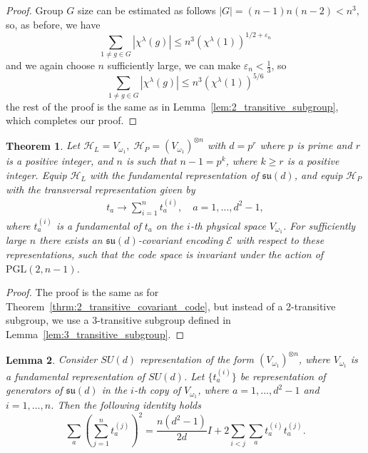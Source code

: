 \documentclass[10pt,twocolumn,superscriptaddress,aps,amsmath,amssymb,citeautoscript,floatfix,prx]{revtex4-2}
\theoremstyle{plain}
\theoremstyle{plain}
\theoremstyle{plain}
\theoremstyle{plain}
\theoremstyle{plain}
\theoremstyle{plain}
\theoremstyle{plain}
\newtheorem{smtheorem}{Theorem}[section]
\newtheorem{smlemma}[smtheorem]{Lemma}
\theoremstyle{definition}
\theoremstyle{plain}
\begin{document}
\begin{appendix}
\begin{proof}
    Group $G$ size can be estimated as follows
    $
        |G|=(n-1) n(n-2)<n^3,
    $
    so, as before, we have
    \[
        \sum_{1 \neq g \in G}\left|\chi^\lambda(g)\right| \leq n^3\left(\chi^\lambda(1)\right)^{1 / 2+\varepsilon_n}
    \]
    and we again choose $n$ sufficiently large, we can make $\varepsilon_n<\frac{1}{3}$, so
    \[
        \sum_{1 \neq g \in G}\left|\chi^\lambda(g)\right| \leq n^3\left(\chi^\lambda(1)\right)^{5 / 6}
    \]
    the rest of the proof is the same as in Lemma~\ref{lem:2_transitive_subgroup}, which completes our proof.
\end{proof}

\begin{smtheorem}\label{thrm:3_transitive_covariant_code}
        Let
    $
        \mathcal H_L=V_{\omega_1},\;
        \mathcal H_P=(V_{\omega_1})^{\otimes n}
    $
    with $d=p^r$ where $p$ is prime and $r$ is a positive integer, 
    and $n$ is such that $n-1=p^k$, where $k \geq r$ is a positive integer. 
    Equip \(\mathcal H_L\) with the fundamental representation of
    \(\mathfrak{su}(d)\), and equip \(\mathcal H_P\) with the transversal
    representation given by
    \begin{equation}
    \begin{gathered}
    t_a \rightarrow \sum_{i=1}^n t_a^{(i)}, \quad a=1,\ldots,d^2-1,
    \end{gathered}
    \end{equation} 
    where $t_a^{(i)}$ is a fundamental of $t_a$ on the $i$-th physical space $V_{\omega_1}$.
    For sufficiently
    large $n$ there exists an $\mathfrak{su}(d)$-covariant encoding $\mathcal{E}$ with respect to these representations, 
    such that the code space is invariant under the action of $\mathrm{PGL}(2, n-1)$. 
\end{smtheorem}

\begin{proof}
    The proof is the same as for Theorem~\ref{thrm:2_transitive_covariant_code}, but instead of a 2-transitive subgroup, 
    we use a 3-transitive subgroup defined in Lemma~\ref{lem:3_transitive_subgroup}.
\end{proof}

\begin{smlemma}\label{lem:generalisation_of_Casimir_identity}
Consider $SU(d)$ representation of the form $(V_{\omega_1})^{\otimes n}$, where $V_{\omega_1}$ is 
a fundamental representation of $SU(d)$. Let $\{t_a^{(i)}\}$ be representation of generators of $\mathfrak{su}(d)$ in the $i$-th copy of $V_{\omega_1}$, where $a=1, \ldots, d^2-1$ and $i=1, \ldots, n$. Then the following identity holds
\[
    \sum_a\left(\sum_{j=1}^n t^{(j)}_a\right)^2=\frac{n\left(d^2-1\right)}{2 d} I+2 \sum_{i<j} \sum_a t^{(i)}_a t^{(j)}_a.
\]
\end{smlemma}


\end{appendix}
\end{document}
